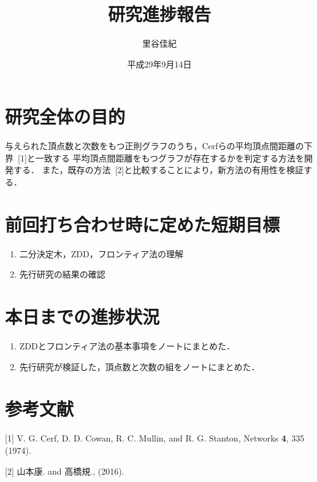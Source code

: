 \documentclass[xelatex,ja=standard,11pt]{bxjsarticle}
\title{研究進捗報告}
\author{里谷佳紀}
\date{平成29年9月14日}
\providecommand{\tightlist}{%
  \setlength{\itemsep}{0pt}\setlength{\parskip}{0pt}}
\begin{document}
\maketitle

\section{研究全体の目的}

与えられた頂点数と次数をもつ正則グラフのうち，Cerfらの平均頂点間距離の下界~{[}1{]}と一致する
平均頂点間距離をもつグラフが存在するかを判定する方法を開発する．
また，既存の方法~{[}2{]}と比較することにより，新方法の有用性を検証する．

\section{前回打ち合わせ時に定めた短期目標}

\begin{enumerate}
\def\labelenumi{\arabic{enumi}.}
\tightlist
\item
  二分決定木，ZDD，フロンティア法の理解
\item
  先行研究の結果の確認
\end{enumerate}

\section{本日までの進捗状況}

\begin{enumerate}
\def\labelenumi{\arabic{enumi}.}
\tightlist
\item
  ZDDとフロンティア法の基本事項をノートにまとめた．
\item
  先行研究が検証した，頂点数と次数の組をノートにまとめた．
\end{enumerate}

\section*{参考文献}

\hypertarget{refs}{}
\hypertarget{ref-Cerf1974}{}
{[}1{]} V. G. Cerf, D. D. Cowan, R. C. Mullin, and R. G. Stanton,
Networks \textbf{4}, 335 (1974).

\hypertarget{ref-Yamamoto2016}{}
{[}2{]} 山本康. and 高橋規., (2016).
\end{document}
